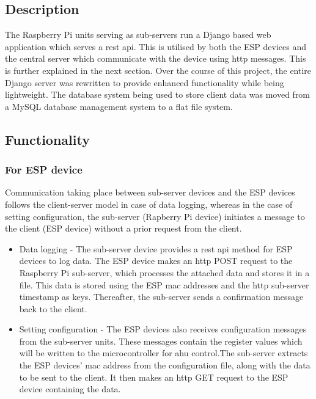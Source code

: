 \documentclass[letterpaper,11pt]{report}
\begin{document}
\subsection{Description}
The Raspberry Pi units serving as sub-servers run a Django based web application which serves a \ac{rest} \ac{api}. This is utilised by both the ESP devices and the central server which communicate with the device using \ac{http} messages. This is further explained in the next section. Over the course of this project, the entire Django server was rewritten to provide enhanced functionality while being lightweight. The database system being used to store client data was moved from a MySQL database management system to a flat file system.
\subsection{Functionality}
\subsubsection{For ESP device}
Communication taking place between sub-server devices and the ESP devices follows the client-server model in case of data logging, whereas in the case of setting configuration, the sub-server (Rapberry Pi device) initiates a message to the client (ESP device) without a prior request from the client.
\begin{itemize}
    \item Data logging - The sub-server device provides a \ac{rest} \ac{api} method for ESP devices to log data. The ESP device makes an \ac{http} POST request to the Raspberry Pi sub-server, which processes the attached data and stores it in a file. This data is stored using the ESP \ac{mac} addresses and the \ac{http} sub-server timestamp as keys. Thereafter, the sub-server sends a confirmation message back to the client.
    \item Setting configuration - The ESP devices also receives configuration messages from the sub-server units. These messages contain the register values which will be written to the microcontroller for \ac{ahu} control.\hfill \break The sub-server extracts the ESP devices' \ac{mac} address from the configuration file, along with the data to be sent to the client. It then makes an \ac{http} GET request to the ESP device containing the data.
\end{itemize}
\end{document}
